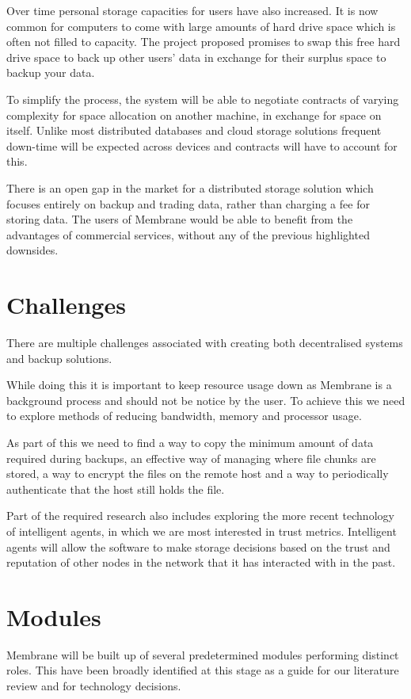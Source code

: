 \documentclass[11pt, a4paper, twocolumn, twoside]{report}
\begin{document}
Over time personal storage capacities for users have also increased. It is now common for computers to come with large amounts of hard drive space which is often not filled to capacity. The project proposed promises to swap this free hard drive space to back up other users’ data in exchange for their surplus space to backup your data.

To simplify the process, the system will be able to negotiate contracts of varying complexity for space allocation on another machine, in exchange for space on itself. Unlike most distributed databases and cloud storage solutions frequent down-time will be expected across devices and contracts will have to account for this.

There is an open gap in the market for a distributed storage solution which focuses entirely on backup and trading data, rather than charging a fee for storing data. The users of Membrane would be able to benefit from the advantages of commercial services, without any of the previous highlighted downsides.

\section{Challenges}
There are multiple challenges associated with creating both decentralised systems and backup solutions.

While doing this it is important to keep resource usage down as Membrane is a background process and should not be notice by the user. To achieve this we need to explore methods of reducing bandwidth, memory and processor usage.

As part of this we need to find a way to copy the minimum amount of data required during backups, an effective way of managing where file chunks are stored, a way to encrypt the files on the remote host and a way to periodically authenticate that the host still holds the file.

Part of the required research also includes exploring the more recent technology of intelligent agents, in which we are most interested in trust metrics. Intelligent agents will allow the software to make storage decisions based on the trust and reputation of other nodes in the network that it has interacted with in the past.

\section{Modules}

Membrane will be built up of several predetermined modules performing distinct roles. This have been broadly identified at this stage as a guide for our literature review and for technology decisions.
\end{document}
